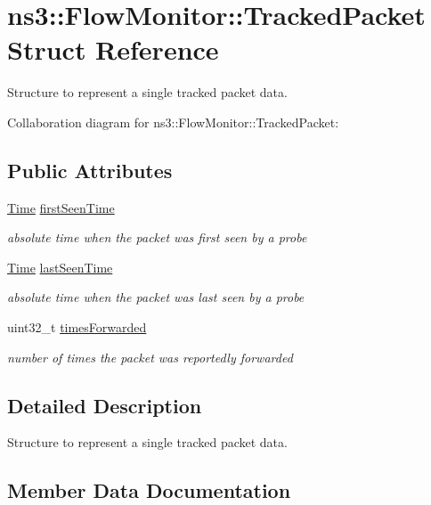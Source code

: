 \hypertarget{structns3_1_1FlowMonitor_1_1TrackedPacket}{}\section{ns3\+:\+:Flow\+Monitor\+:\+:Tracked\+Packet Struct Reference}
\label{structns3_1_1FlowMonitor_1_1TrackedPacket}


Structure to represent a single tracked packet data.  




Collaboration diagram for ns3\+:\+:Flow\+Monitor\+:\+:Tracked\+Packet\+:
\subsection*{Public Attributes}
\begin{DoxyCompactItemize}
\item 
\hyperlink{classns3_1_1Time}{Time} \hyperlink{structns3_1_1FlowMonitor_1_1TrackedPacket_a46d132e43ac7d1c05ab0b691fccb9c73}{first\+Seen\+Time}
\begin{DoxyCompactList}\small\item\em absolute time when the packet was first seen by a probe \end{DoxyCompactList}\item 
\hyperlink{classns3_1_1Time}{Time} \hyperlink{structns3_1_1FlowMonitor_1_1TrackedPacket_a16e300794c367f5e1ea5131962de8d08}{last\+Seen\+Time}
\begin{DoxyCompactList}\small\item\em absolute time when the packet was last seen by a probe \end{DoxyCompactList}\item 
uint32\+\_\+t \hyperlink{structns3_1_1FlowMonitor_1_1TrackedPacket_ad55c536da8963b1ba9be7b8d41d6aa39}{times\+Forwarded}
\begin{DoxyCompactList}\small\item\em number of times the packet was reportedly forwarded \end{DoxyCompactList}\end{DoxyCompactItemize}


\subsection{Detailed Description}
Structure to represent a single tracked packet data. 

\subsection{Member Data Documentation}
